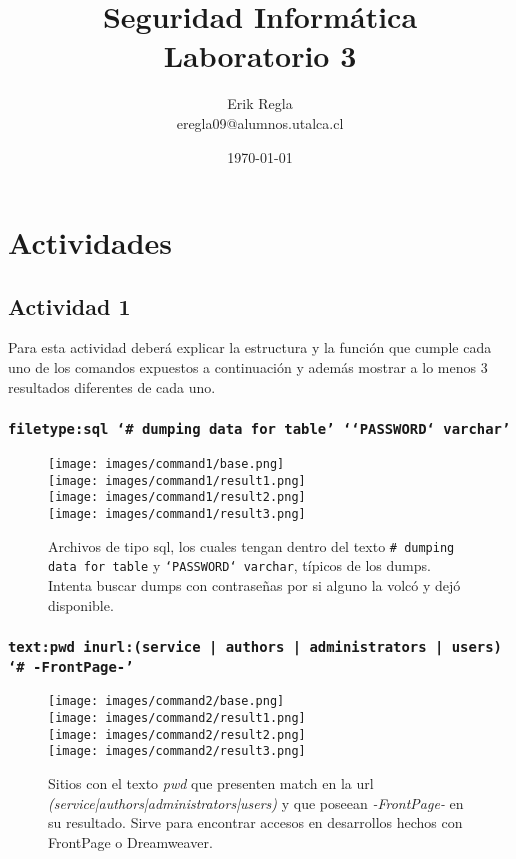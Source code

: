 \documentclass[11pt]{utalcaDoc}
\title{{\bf Seguridad Informática}\\ Laboratorio 3}
\author{Erik Regla\\ eregla09@alumnos.utalca.cl}
\date{\today}
\begin{document}
\maketitle
\newpage
\tableofcontents
\newpage

\section{Actividades}
\subsection{Actividad 1}{Para esta actividad deberá explicar la estructura y la función que cumple cada uno de los comandos expuestos a continuación y además mostrar a lo menos 3 resultados diferentes de cada uno.}

\subsubsection{\texttt{filetype:sql \enquote*{\# dumping data for table} \enquote*{`PASSWORD` varchar}}}
\begin{figure}[H]
	\centering
\begin{multicols}{4}
	\texttt{[image: images/command1/base.png]}\\
	\texttt{[image: images/command1/result1.png]}\\
	\texttt{[image: images/command1/result2.png]}\\
	\texttt{[image: images/command1/result3.png]}\\
\end{multicols}
\caption{Archivos de tipo sql, los cuales tengan dentro del texto \texttt{\# dumping data for table} y \texttt{`PASSWORD` varchar}, típicos de los dumps. Intenta buscar dumps con contraseñas por si alguno la volcó y dejó disponible.}
\label{FIG:command1}
\end{figure}

\subsubsection{\texttt{text:pwd inurl:(service | authors | administrators | users) \enquote*{\# -FrontPage-}\  }}
\begin{figure}[H]
	\centering
\begin{multicols}{4}
	\texttt{[image: images/command2/base.png]}\\
	\texttt{[image: images/command2/result1.png]}\\
	\texttt{[image: images/command2/result2.png]}\\
	\texttt{[image: images/command2/result3.png]}\\
\end{multicols}
\caption{Sitios con el texto \textit{pwd} que presenten match en la url \textit{(service|authors|administrators|users)} y que poseean \textit{-FrontPage-} en su resultado. Sirve para encontrar accesos en desarrollos hechos con FrontPage o Dreamweaver.}
\label{FIG:command2}
\end{figure}
\end{document}
